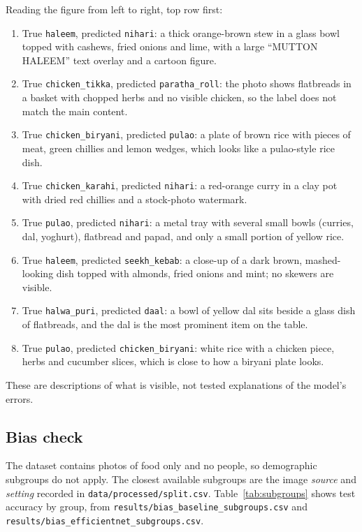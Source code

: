 Reading the figure from left to right, top row first:
\begin{enumerate}
  \item True \texttt{haleem}, predicted \texttt{nihari}: a thick orange-brown
        stew in a glass bowl topped with cashews, fried onions and lime, with
        a large ``MUTTON HALEEM'' text overlay and a cartoon figure.
  \item True \texttt{chicken\_tikka}, predicted \texttt{paratha\_roll}: the
        photo shows flatbreads in a basket with chopped herbs and no visible
        chicken, so the label does not match the main content.
  \item True \texttt{chicken\_biryani}, predicted \texttt{pulao}: a plate of
        brown rice with pieces of meat, green chillies and lemon wedges,
        which looks like a pulao-style rice dish.
  \item True \texttt{chicken\_karahi}, predicted \texttt{nihari}: a red-orange
        curry in a clay pot with dried red chillies and a stock-photo
        watermark.
  \item True \texttt{pulao}, predicted \texttt{nihari}: a metal tray with
        several small bowls (curries, dal, yoghurt), flatbread and papad, and
        only a small portion of yellow rice.
  \item True \texttt{haleem}, predicted \texttt{seekh\_kebab}: a close-up of a
        dark brown, mashed-looking dish topped with almonds, fried onions and
        mint; no skewers are visible.
  \item True \texttt{halwa\_puri}, predicted \texttt{daal}: a bowl of yellow
        dal sits beside a glass dish of flatbreads, and the dal is the most
        prominent item on the table.
  \item True \texttt{pulao}, predicted \texttt{chicken\_biryani}: white rice
        with a chicken piece, herbs and cucumber slices, which is close to how
        a biryani plate looks.
\end{enumerate}
These are descriptions of what is visible, not tested explanations of the
model's errors.

\subsection{Bias check}
{\sloppy
The dataset contains photos of food only and no people, so demographic
subgroups do not apply. The closest available subgroups are the image
\emph{source} and \emph{setting} recorded in \texttt{data/processed/split.csv}.
Table~\ref{tab:subgroups} shows test accuracy by group, from
\texttt{results/\allowbreak bias\_\allowbreak baseline\_\allowbreak subgroups.csv} and
\texttt{results/\allowbreak bias\_\allowbreak efficientnet\_\allowbreak subgroups.csv}.\par}

